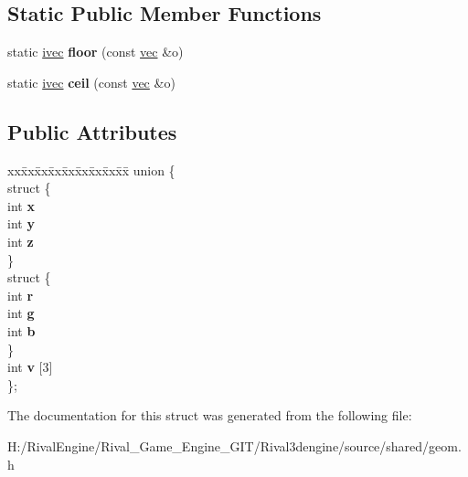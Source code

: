 \subsection*{Static Public Member Functions}
\begin{DoxyCompactItemize}
\item 
\mbox{\label{structivec_a2ca2d9cbaff095f9d60bb2750029ecbc}} 
static \hyperlink{structivec}{ivec} {\bfseries floor} (const \hyperlink{structvec}{vec} \&o)
\item 
\mbox{\label{structivec_a04cd51a34eacad8cce138b74f7b0ae9d}} 
static \hyperlink{structivec}{ivec} {\bfseries ceil} (const \hyperlink{structvec}{vec} \&o)
\end{DoxyCompactItemize}
\subsection*{Public Attributes}
\begin{DoxyCompactItemize}
\item 
\mbox{\label{structivec_a40625b0358f747fc538e43c17e613d5e}} 
\begin{tabbing}
xx\=xx\=xx\=xx\=xx\=xx\=xx\=xx\=xx\=\kill
union \{\\
\mbox{\label{unionivec_1_1_0D185_a503cf3f4a42eb98dc38858f7bf705265}} 
\>struct \{\\
\>\>int {\bfseries x}\\
\>\>int {\bfseries y}\\
\>\>int {\bfseries z}\\
\>\} \\
\mbox{\label{unionivec_1_1_0D185_ad2f6124846371e298afe7a4ae70af1a4}} 
\>struct \{\\
\>\>int {\bfseries r}\\
\>\>int {\bfseries g}\\
\>\>int {\bfseries b}\\
\>\} \\
\>int {\bfseries v} \mbox{[}3\mbox{]}\\
\}; \\

\end{tabbing}\end{DoxyCompactItemize}


The documentation for this struct was generated from the following file\+:\begin{DoxyCompactItemize}
\item 
H\+:/\+Rival\+Engine/\+Rival\+\_\+\+Game\+\_\+\+Engine\+\_\+\+G\+I\+T/\+Rival3dengine/source/shared/geom.\+h\end{DoxyCompactItemize}
